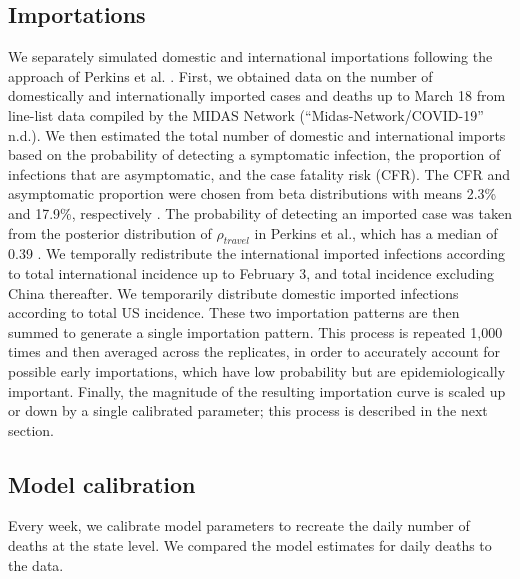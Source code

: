 \documentclass[11pt]{article}
\begin{document}
\subsection{Importations}
We separately simulated domestic and international importations following the approach of Perkins et al. \cite{Perkins2020_MedRxiv}. First, we obtained data on the number of domestically and internationally imported cases and deaths up to March 18 from line-list data compiled by the MIDAS Network (“Midas-Network/COVID-19” n.d.). We then estimated the total number of domestic and international imports based on the probability of detecting a symptomatic infection, the proportion of infections that are asymptomatic, and the case fatality risk (CFR). The CFR and asymptomatic proportion were chosen from beta distributions with means 2.3\% and 17.9\%, respectively \cite{ChinaCDC2020_weekly,Mizumoto2020_Eurosurveillance}. The probability of detecting an imported case was taken from the posterior distribution of $\rho_{travel}$ in Perkins et al., which has a median of 0.39 \cite{Perkins2020_MedRxiv}. We temporally redistribute the international imported infections according to total international incidence up to February 3, and total incidence excluding China thereafter. We temporarily distribute domestic imported infections according to total US incidence. These two importation patterns are then summed to generate a single importation pattern. This process is repeated 1,000 times and then averaged across the replicates, in order to accurately account for possible early importations, which have low probability but are epidemiologically important. Finally, the magnitude of the resulting importation curve is scaled up or down by a single calibrated parameter; this process is described in the next section.

\subsection{Model calibration}
Every week, we calibrate model parameters to recreate the daily number of deaths at the state level. We compared the model estimates for daily deaths to the data.
\end{document}
